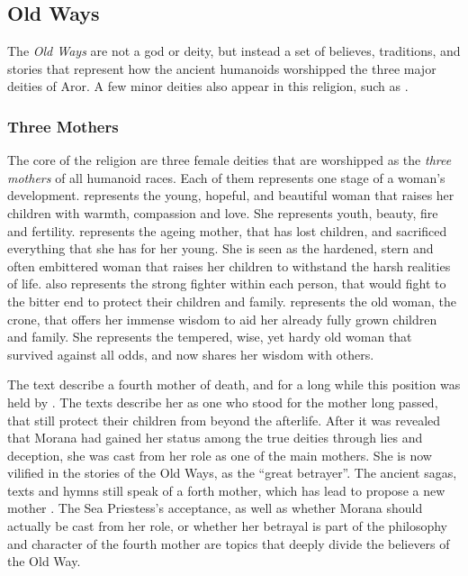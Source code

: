 \subsection{Old Ways}
\label{sec:Old Ways}

The \emph{Old Ways} are not a god or deity, but instead a set of believes,
traditions, and stories that represent how the ancient humanoids worshipped
the three major deities of Aror. A few minor deities also appear in this
religion, such as .

\subsubsection{Three Mothers}
\label{sec:Three Mothers}

The core of the religion are three female deities that are worshipped as the
\emph{three mothers} of all humanoid races. Each of them represents one stage
of a woman's development.  represents the young, hopeful,
and beautiful woman that raises her children with warmth, compassion and
love. She represents youth, beauty, fire and fertility. 
represents the ageing mother, that has lost children, and sacrificed
everything that she has for her young. She is seen as the hardened, stern and
often embittered woman that raises her children to withstand the harsh
realities of life.  also represents the strong fighter
within each person, that would fight to the bitter end to protect their
children and family.  represents the old woman, the crone,
that offers her immense wisdom to aid her already fully grown children and
family. She represents the tempered, wise, yet hardy old woman that survived
against all odds, and now shares her wisdom with others.

The text describe a fourth mother of death, and for a long while this position
was held by . The texts describe her as one who stood for
the mother long passed, that still protect their children from beyond the
afterlife. After it was revealed that Morana had gained her status among the
true deities through lies and deception, she was cast from her role as one of
the main mothers. She is now vilified in the stories of the Old Ways, as the
``great betrayer''. The ancient sagas, texts and hymns still speak of a forth
mother, which has lead  to propose a new mother
. The Sea Priestess's acceptance, as well as
whether Morana should actually be cast from her role, or whether her betrayal
is part of the philosophy and character of the fourth mother are topics that
deeply divide the believers of the Old Way.

